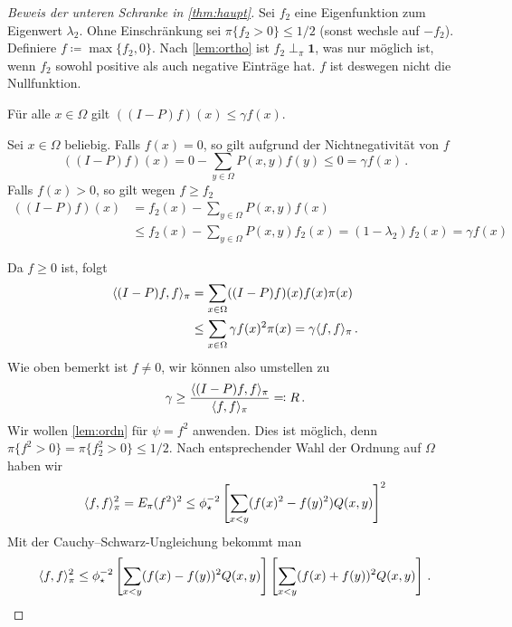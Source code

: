 \documentclass[ngerman,a4paper,11pt]{scrartcl}
\DeclarePairedDelimiter{\sprod}{\langle}{\rangle}	%
\begin{document}
\begin{proof}[Beweis der unteren Schranke in \cref{thm:haupt}]
 Sei $f_2$ eine Eigenfunktion zum Eigenwert $\lambda_2$. Ohne Einschränkung sei
 $\pi\{f_2>0\}\leq 1/2$ (sonst wechsle auf $-f_2$). Definiere $f\coloneqq\max\{f_2,0\}$.
 Nach \cref{lem:ortho} ist $f_2\perp_\pi\mathbf{1}$, was nur möglich ist, wenn
 $f_2$ sowohl positive als auch negative Einträge hat. $f$ ist deswegen nicht die Nullfunktion.
 \begin{claim}
  Für alle $x\in\Omega$ gilt $((I-P)f)(x)\leq\gamma f(x)$.
 \end{claim}
 \begin{dproof}
  Sei $x\in\Omega$ beliebig. Falls $f(x)=0$, so gilt aufgrund der Nichtnegativität von $f$
  \begin{equation*}
   ((I-P)f)(x)=0-\sum_{y\in\Omega}P(x,y)f(y)\leq 0=\gamma f(x)\, . 
  \end{equation*}
  Falls $f(x)>0$, so gilt wegen $f\geq f_2$
  \begin{align*}
   ((I-P)f)(x)&=f_2(x)-\sum_{y\in\Omega}P(x,y)f(x) \\
   &\leq f_2(x)-\sum_{y\in\Omega}P(x,y)f_2(x)=(1-\lambda_2)f_2(x)=\gamma f(x)
  \end{align*} 
 \end{dproof}
 Da $f\geq 0$ ist, folgt
 \begin{align}
  \begin{split}
   \label{eq:R}
   \sprod{(I-P)f,f}_\pi&=\sum_{x\in\Omega}((I-P)f)(x)f(x)\pi(x) \\
   &\leq \sum_{x\in\Omega}\gamma f(x)^2\pi(x)=\gamma\sprod{f,f}_\pi\, .
  \end{split}
 \end{align}
 Wie oben bemerkt ist $f\neq 0$, wir können also umstellen zu
 \begin{equation*}
  \gamma\geq\frac{\sprod{(I-P)f,f}_\pi}{\sprod{f,f}_\pi}\eqqcolon R\, . 
 \end{equation*}
 Wir wollen \cref{lem:ordn} für $\psi=f^2$ anwenden. Dies ist möglich, denn
 $\pi\{f^2>0\}=\pi\{f_2^2>0\}\leq 1/2$. Nach entsprechender Wahl der Ordnung auf
 $\Omega$ haben wir
 \begin{equation*}
  \sprod{f,f}_\pi^2=E_\pi(f^2)^2\leq\phi_\star^{-2}\left[ \sum_{x<y}(f(x)^2-f(y)^2)Q(x,y) \right]^2
 \end{equation*}
 Mit der Cauchy--Schwarz-Ungleichung bekommt man
 \begin{equation}
  \label{eq:cauchy}
  \sprod{f,f}_\pi^2\leq\phi_\star^{-2}\left[ \sum_{x<y}(f(x)-f(y))^2Q(x,y) \right]\left[ \sum_{x<y}(f(x)+f(y))^2Q(x,y) \right]\, .

\end{equation}
\end{proof}
\end{document}
